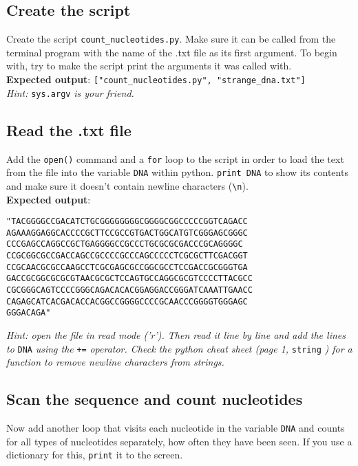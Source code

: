 \documentclass[12pt]{article}
\begin{document}
\subsection{Create the script}
Create the script \verb|count_nucleotides.py|. Make sure it can be called from the terminal program with the name of the .txt file as its first argument. To begin with, try to make the script print the arguments it was called with. \\

\noindent\textbf{Expected output}: \verb|["count_nucleotides.py", "strange_dna.txt"]|\\

\noindent\emph{Hint:} \texttt{sys.argv} \emph{is your friend.}

\subsection{Read the .txt file}
Add the \texttt{open()} command and a \texttt{for} loop to the script in order to load the text from the file into the variable \texttt{DNA} within python. \texttt{print DNA} to show its contents and make sure it doesn't contain newline characters (\texttt{\textbackslash n}).\\

\noindent\textbf{Expected output}:
\begin{verbatim}
"TACGGGGCCGACATCTGCGGGGGGGGCGGGGCGGCCCCCGGTCAGACC
AGAAAGGAGGCACCCCGCTTCCGCCGTGACTGGCATGTCGGGAGCGGGC
CCCGAGCCAGGCCGCTGAGGGGCCGCCCTGCGCGCGACCCGCAGGGGC
CCGCGGCGCCGACCAGCCGCCCCGCCCAGCCCCCTCGCGCTTCGACGGT
CCGCAACGCGCCAAGCCTCGCGAGCGCCGGCGCCTCCGACCGCGGGTGA
GACCGCGGCGCGCGTAACGCGCTCCAGTGCCAGGCGCGTCCCCTTACGCC
CGCGGGCAGTCCCCGGGCAGACACACGGAGGACCGGGATCAAATTGAACC
CAGAGCATCACGACACCACGGCCGGGGCCCCGCAACCCGGGGTGGGAGC
GGGACAGA"
\end{verbatim}

\noindent\emph{Hint: open the file in read mode ('r'). Then read it line by line and add the lines to} \texttt{DNA} \emph{using the} \texttt{+=} \emph{operator. Check the python cheat sheet (page 1, } \texttt{string} \emph{) for a function to remove newline characters from strings.}

\subsection{Scan the sequence and count nucleotides}
Now add another loop that visits each nucleotide in the variable \texttt{DNA} and counts for all types of nucleotides separately, how often they have been seen. If you use a dictionary for this, \texttt{print} it to the screen.\\
\end{document}
